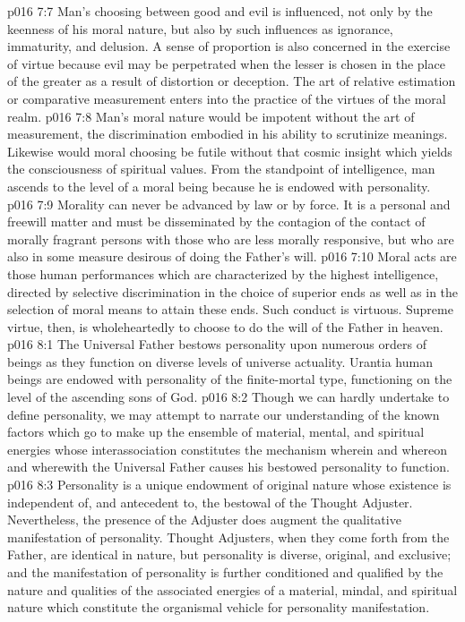 \vs p016 7:7 Man’s choosing between good and evil is influenced, not only by the keenness of his moral nature, but also by such influences as ignorance, immaturity, and delusion. A sense of proportion is also concerned in the exercise of virtue because evil may be perpetrated when the lesser is chosen in the place of the greater as a result of distortion or deception. The art of relative estimation or comparative measurement enters into the practice of the virtues of the moral realm.
\vs p016 7:8 \pc Man’s moral nature would be impotent without the art of measurement, the discrimination embodied in his ability to scrutinize meanings. Likewise would moral choosing be futile without that cosmic insight which yields the consciousness of spiritual values. From the standpoint of intelligence, man ascends to the level of a moral being because he is endowed with personality.
\vs p016 7:9 \pc Morality can never be advanced by law or by force. It is a personal and freewill matter and must be disseminated by the contagion of the contact of morally fragrant persons with those who are less morally responsive, but who are also in some measure desirous of doing the Father’s will.
\vs p016 7:10 Moral acts are those human performances which are characterized by the highest intelligence, directed by selective discrimination in the choice of superior ends as well as in the selection of moral means to attain these ends. Such conduct is virtuous. Supreme virtue, then, is wholeheartedly to choose to do the will of the Father in heaven.
\vs p016 8:1 The Universal Father bestows personality upon numerous orders of beings as they function on diverse levels of universe actuality. Urantia human beings are endowed with personality of the finite\hyp{}mortal type, functioning on the level of the ascending sons of God.
\vs p016 8:2 Though we can hardly undertake to define personality, we may attempt to narrate our understanding of the known factors which go to make up the ensemble of material, mental, and spiritual energies whose interassociation constitutes the mechanism wherein and whereon and wherewith the Universal Father causes his bestowed personality to function.
\vs p016 8:3 Personality is a unique endowment of original nature whose existence is independent of, and antecedent to, the bestowal of the Thought Adjuster. Nevertheless, the presence of the Adjuster does augment the qualitative manifestation of personality. Thought Adjusters, when they come forth from the Father, are identical in nature, but personality is diverse, original, and exclusive; and the manifestation of personality is further conditioned and qualified by the nature and qualities of the associated energies of a material, mindal, and spiritual nature which constitute the organismal vehicle for personality manifestation.
